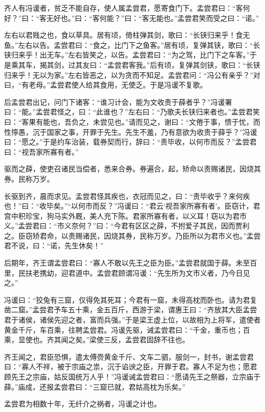 \documentclass[12pt,UTF-8,openany]{ctexbook}
\begin{document}
\begin{normalsize}
    
    齐人有冯谖者，贫乏不能自存，使人属孟尝君，愿寄食门下。孟尝君曰：“客何好？”曰：“客无好也。”曰：“客何能？”曰：“客无能也。”孟尝君笑而受之曰：“诺。”
    
    左右以君贱之也，食以草具。居有顷，倚柱弹其剑，歌曰：“长铗归来乎！食无鱼。”左右以告。孟尝君曰：“食之，比门下之鱼客。”居有顷，复弹其铗，歌曰：“长铗归来乎！出无车。”左右皆笑之，以告。孟尝君曰：“为之驾，比门下之车客。”于是乘其车，揭其剑，过其友曰：“孟尝君客我。”后有顷，复弹其剑铗，歌曰：“长铗归来乎！无以为家。”左右皆恶之，以为贪而不知足。孟尝君问：“冯公有亲乎？”对曰，“有老母。”孟尝君使人给其食用，无使乏。于是冯谖不复歌。
    
    后孟尝君出记，问门下诸客：“谁习计会，能为文收责于薛者乎？”冯谖署曰：“能。”孟尝君怪之，曰：“此谁也？”左右曰：“乃歌夫长铗归来者也。”孟尝君笑曰：“客果有能也，吾负之，未尝见也。”请而见之，谢曰：“文倦于事，愦于忧，而性懧愚，沉于国家之事，开罪于先生。先生不羞，乃有意欲为收责于薛乎？”冯谖曰：“愿之。”于是约车治装，载券契而行，辞曰：“责毕收，以何市而反？”孟尝君曰：“视吾家所寡有者。”
    
    驱而之薛，使吏召诸民当偿者，悉来合券。券遍合，起，矫命以责赐诸民，因烧其券。民称万岁。
    
    长驱到齐，晨而求见。孟尝君怪其疾也，衣冠而见之，曰：“责毕收乎？来何疾也！”曰：“收毕矣。”“以何市而反？”冯谖曰：“君云‘视吾家所寡有者’。臣窃计，君宫中积珍宝，狗马实外厩，美人充下陈。君家所寡有者，以义耳！窃以为君市义。”孟尝君曰：“市义奈何？”曰：“今君有区区之薛，不拊爱子其民，因而贾利之。臣窃矫君命，以责赐诸民，因烧其券，民称万岁。乃臣所以为君市义也。”孟尝君不说，曰：“诺，先生休矣！”
    
    后期年，齐王谓孟尝君曰：“寡人不敢以先王之臣为臣。”孟尝君就国于薛。未至百里，民扶老携幼，迎君道中。孟尝君顾谓冯谖：“先生所为文市义者，乃今日见之。”
    
    冯谖曰：“狡兔有三窟，仅得免其死耳；今君有一窟，未得高枕而卧也。请为君复凿二窟。”孟尝君予车五十乘，金五百斤，西游于梁，谓惠王曰：“齐放其大臣孟尝君于诸侯，诸侯先迎之者，富而兵强。”于是梁王虚上位，以故相为上将军，遣使者黄金千斤，车百乘，往聘孟尝君。冯谖先驱，诫孟尝君曰：“千金，重币也；百乘，显使也。齐其闻之矣。”梁使三反，孟尝君固辞不往也。
    
    齐王闻之，君臣恐惧，遣太傅赍黄金千斤、文车二驷，服剑一，封书，谢孟尝君曰：“寡人不祥，被于宗庙之祟，沉于谄谀之臣，开罪于君。寡人不足为也；愿君顾先王之宗庙，姑反国统万人乎！”冯谖诫孟尝君曰：“愿请先王之祭器，立宗庙于薛。”庙成，还报孟尝君曰：“三窟已就，君姑高枕为乐矣。”
    
    孟尝君为相数十年，无纤介之祸者，冯谖之计也。
\end{normalsize}
\end{document}
